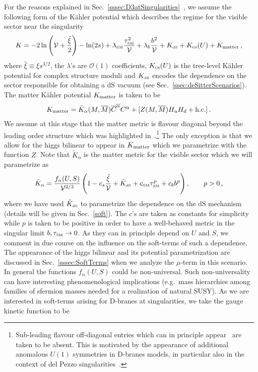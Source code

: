 \documentclass[12pt,a4paper]{book}
\def\SM{{\scriptscriptstyle \rm SM}}
\def\dS{{\scriptscriptstyle \rm dS}}
\newcommand{\mc}{\mathcal}
\begin{document}
For the reasons explained in Sec.~\ref{sssec:D3atSingularities}~\cite{Conlon:2008wa,Blumenhagen:2009gk}, we assume the following form of the K\"ahler potential which describes the regime for the visible sector near the singularity
\begin{align}
\label{generalk}
K = - 2 \ln\left(\mathcal{V} + \frac{\hat\xi}{2}\right) - \ln(2s) + \lambda_\SM \frac{\tau_\SM^2}{\mathcal{V}} + \lambda_b \frac{b^2}{\mathcal{V}} + K_\dS + K_{\rm cs}(U) + K_{\rm matter}\, ,
\end{align}
where $\hat\xi\equiv \xi s^{3/2}$, the $\lambda$'s are $\mc{O}(1)$ coefficients, $K_{\rm cs}(U)$ is the tree-level K\"ahler potential for complex structure moduli and $K_\dS$ encodes the dependence on the sector responsible for obtaining a dS vacuum (see Sec.~\ref{ssec:deSitterScenarios}). The matter K\"ahler potential $K_{\rm matter}$ is taken to be
\begin{align}
K_{\rm matter} = \tilde{K}_{\alpha}(M, \overline{M}) \overline{C}^{\overline{\alpha}} C^{\alpha} + [Z(M, \overline{M}) H_u H_d + \text{h.c.}]\,.
\label{mm}
\end{align}
We assume at this stage that the matter metric is flavour diagonal beyond the leading order structure which was highlighted in~\cite{Conlon:2007dw}.\footnote{Sub-leading flavour off-diagonal entries which can in principle appear~\cite{Camara:2013fta} are taken to be absent. This is motivated by the appearance of additional anomalous $U(1)$ symmetries in D-branes models, in particular also in the context of del Pezzo singularities~\cite{Dolan:2011qu}.} The only exception is that we allow for the higgs bilinear to appear in $K_{\rm matter}$ which we parametrize with the function $Z$. Note that $\tilde{K}_\alpha$ is the matter metric for the visible sector which we will parametrize as~\cite{Blumenhagen:2009gk}
\begin{align}
\tilde{K}_{\alpha} = \frac{f_\alpha(U,S)}{\mathcal{V}^{2/3}} \left(1 - c_s \frac{\hat\xi}{\mathcal{V}}
+ \tilde{K}_\dS + c_\SM \tau_\SM^p + c_b b^p\right), \qquad p > 0\,,
\label{mattermetric}
\end{align}
where we have used $\tilde{K}_\dS$ to parametrize the dependence on the dS mechanism (details will be given in Sec.~\ref{soft}). The $c$'s are taken as constants for simplicity while $p$ is taken to be positive in order to have a well-behaved metric in the singular limit $b,\tau_\SM \to 0$. As they can in principle depend on $U$ and $S$, we comment in due course on the influence on the soft-terms of such a dependence. The appearance of the higgs bilinear and its potential parametrization are discussed in Sec.~\ref{sssec:SoftTerms} when we analyze the $\mu$-term in this scenario. In general the functions $f_\alpha(U,S)$ could be non-universal. Such non-universality can have interesting phenomenological implications (e.g.~mass hierarchies among families of sfermion masses needed for a realization of natural SUSY). As we are interested in soft-terms arising for D-branes at singularities, we take the gauge kinetic function to be
\end{document}
